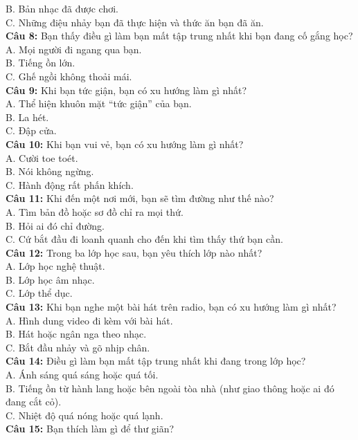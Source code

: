 \begin{multicols}{2}
B. Bản nhạc đã được chơi. \\
C. Những điệu nhảy bạn đã thực hiện và thức ăn bạn đã ăn. \\
\textbf{Câu 8:} Bạn thấy điều gì làm bạn mất tập trung nhất khi bạn đang cố gắng học? \\
A. Mọi người đi ngang qua bạn. \\
B. Tiếng ồn lớn. \\
C. Ghế ngồi không thoải mái. \\
\textbf{Câu 9:} Khi bạn tức giận, bạn có xu hướng làm gì nhất? \\
A. Thể hiện khuôn mặt ``tức giận'' của bạn. \\
B. La hét. \\
C. Đập cửa. \\
\textbf{Câu 10:} Khi bạn vui vẻ, bạn có xu hướng làm gì nhất? \\
A. Cười toe toét. \\
B. Nói không ngừng. \\
C. Hành động rất phấn khích. \\
\textbf{Câu 11:} Khi đến một nơi mới, bạn sẽ tìm đường như thế nào? \\
A. Tìm bản đồ hoặc sơ đồ chỉ ra mọi thứ. \\
B. Hỏi ai đó chỉ đường. \\
C. Cứ bắt đầu đi loanh quanh cho đến khi tìm thấy thứ bạn cần. \\
\textbf{Câu 12:} Trong ba lớp học sau, bạn yêu thích lớp nào nhất? \\
A. Lớp học nghệ thuật. \\
B. Lớp học âm nhạc. \\
C. Lớp thể dục. \\
\textbf{Câu 13:} Khi bạn nghe một bài hát trên radio, bạn có xu hướng làm gì nhất? \\
A. Hình dung video đi kèm với bài hát. \\
B. Hát hoặc ngân nga theo nhạc. \\
C. Bắt đầu nhảy và gõ nhịp chân. \\
\textbf{Câu 14:} Điều gì làm bạn mất tập trung nhất khi đang trong lớp học? \\
A. Ánh sáng quá sáng hoặc quá tối. \\
B. Tiếng ồn từ hành lang hoặc bên ngoài tòa nhà (như giao thông hoặc ai đó đang cắt cỏ). \\
C. Nhiệt độ quá nóng hoặc quá lạnh. \\
\textbf{Câu 15:} Bạn thích làm gì để thư giãn? \\

\end{multicols}
